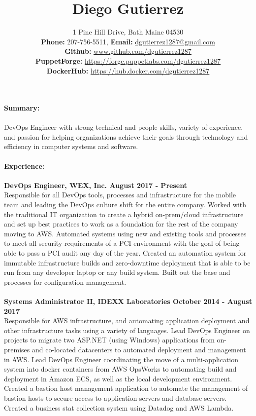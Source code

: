 \documentclass[10pt]{article}
\title{Diego Gutierrez}
\date{}
\author{%
	1 Pine Hill Drive, Bath Maine 04530\\
	\textbf{Phone:} 207-756-5511, \textbf{Email:} \underline{dgutierrez1287@gmail.com}\\
	\textbf{Github:} \tab\underline{www.github.com/dgutierrez1287}\\
	\textbf{PuppetForge:} \underline{https://forge.puppetlabs.com/dgutierrez1287}\\
	\textbf{DockerHub:} \space\space\underline{https://hub.docker.com/dgutierrez1287}
}
\makeatletter
\renewcommand{\maketitle}{\bgroup\setlength{\parindent}{0pt}
	\begin{flushleft}
		\LARGE\textbf{\@title}
		
		\normalsize\@author
	\end{flushleft}\egroup
}
\makeatother
\begin{document}
\maketitle
\thispagestyle{empty} %
\noindent\Large\textbf{Summary:}\\
\\
\normalsize DevOps Engineer with strong technical and people skills, variety of experience, and passion for helping organizations achieve their goals through technology and efficiency in computer systems and software.
\\
\\
\noindent\Large\textbf{Experience:}\\
\\
\normalsize
\textbf{DevOps Engineer, WEX, Inc. \hfill{August 2017 - Present}}\\
\normalsize Responsible for all DevOps tools, processes and infrastructure for the mobile team and leading the DevOps culture shift for the entire company. Worked with the traditional IT organization to create a hybrid on-prem/cloud 
infrastructure and set up best practices to work as a foundation for the rest of the company moving to AWS. Automated systems using new and existing tools and processes to meet all security requirements of a PCI environment with the 
goal of being able to pass a PCI audit any day of the year. Created an automation system for immutable infrastructure builds and zero-downtime deployment that is able to be run from any developer laptop or any build system. Built out the base and 
processes for configuration management. 
\\
\\
\textbf{Systems Administrator II, IDEXX Laboratories \hfill{October 2014 - August 2017}}\\
\normalsize Responsible for AWS infrastructure, and automating application deployment and other infrastructure tasks using a variety of languages. Lead DevOps Engineer on projects to migrate two ASP.NET (using Windows) applications
from on-premises and co-located datacenters to automated deployment and management in AWS. Lead DevOps Engineer coordinating the move of a  multi-application system into docker containers from AWS OpsWorks to automating 
build and deployment in Amazon ECS, as well as the local development environment. Created a bastion host management application to automate the management of bastion hosts to secure access to application servers and database servers.
Created a business stat collection system using Datadog and AWS Lambda.
\end{document}

